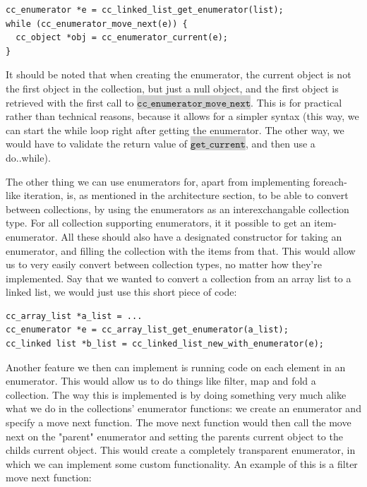 \documentclass[table]{ituthesis}
\newcommand{\highlight}[1]{\colorbox{lightGray}{$\displaystyle \texttt{#1}$}}
\begin{document}
\begin{lstlisting}[label=cc_enumerator-example,caption=Using enumerators in CCollections]
cc_enumerator *e = cc_linked_list_get_enumerator(list);
while (cc_enumerator_move_next(e)) {
  cc_object *obj = cc_enumerator_current(e);
}
\end{lstlisting}

	It should be noted that when creating the enumerator, the current object is not the first object in the collection, but just a null object, and the first object is retrieved with the first call to \highlight{cc\_enumerator\_move\_next}. This is for practical rather than technical reasons, because it allows for a simpler syntax (this way, we can start the while loop right after getting the enumerator. The other way, we would have to validate the return value of \highlight{get\_current}, and then use a do..while).

	The other thing we can use enumerators for, apart from implementing foreach-like iteration, is, as mentioned in the architecture section, to be able to convert between collections, by using the enumerators as an interexchangable collection type. For all collection supporting enumerators, it it possible to get an item-enumerator. All these should also have a designated constructor for taking an enumerator, and filling the collection with the items from that. This would allow us to very easily convert between collection types, no matter how they're implemented. Say that we wanted to convert a collection from an array list to a linked list, we would just use this short piece of code:

\begin{lstlisting}[label=cc_enumerator-new-with,caption=Creating collections with enumerators]
cc_array_list *a_list = ...
cc_enumerator *e = cc_array_list_get_enumerator(a_list);
cc_linked list *b_list = cc_linked_list_new_with_enumerator(e);
\end{lstlisting}

	Another feature we then can implement is running code on each element in an enumerator. This would allow us to do things like filter, map and fold a collection. The way this is implemented is by doing something very much alike what we do in the collections' enumerator functions: we create an enumerator and specify a move next function. The move next function would then call the move next on the "parent" enumerator and setting the parents current object to the childs current object. This would create a completely transparent enumerator, in which we can implement some custom functionality. An example of this is a filter move next function:
	
\end{document}
